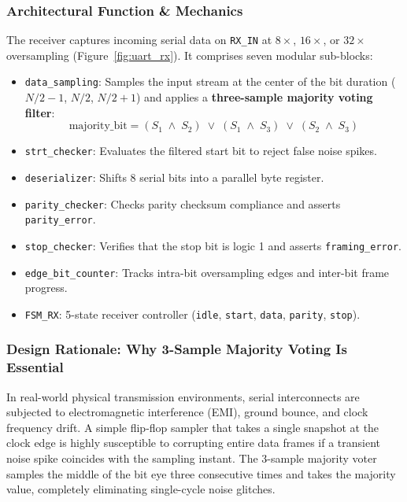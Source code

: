 \documentclass[11pt,a4paper]{article}
\begin{document}
\subsubsection{Architectural Function \& Mechanics}
The receiver captures incoming serial data on \texttt{RX\_IN} at $8\times$, $16\times$, or $32\times$ oversampling (Figure~\ref{fig:uart_rx}). It comprises seven modular sub-blocks:
\begin{itemize}
    \item \texttt{data\_sampling}: Samples the input stream at the center of the bit duration ($N/2-1$, $N/2$, $N/2+1$) and applies a \textbf{three-sample majority voting filter}:
    \begin{equation}
    \text{majority\_bit} = (S_1 \;\land\; S_2) \;\lor\; (S_1 \;\land\; S_3) \;\lor\; (S_2 \;\land\; S_3)
    \end{equation}
    \item \texttt{strt\_checker}: Evaluates the filtered start bit to reject false noise spikes.
    \item \texttt{deserializer}: Shifts 8 serial bits into a parallel byte register.
    \item \texttt{parity\_checker}: Checks parity checksum compliance and asserts \texttt{parity\_error}.
    \item \texttt{stop\_checker}: Verifies that the stop bit is logic 1 and asserts \texttt{framing\_error}.
    \item \texttt{edge\_bit\_counter}: Tracks intra-bit oversampling edges and inter-bit frame progress.
    \item \texttt{FSM\_RX}: 5-state receiver controller (\texttt{idle}, \texttt{start}, \texttt{data}, \texttt{parity}, \texttt{stop}).
\end{itemize}

\subsubsection{Design Rationale: Why 3-Sample Majority Voting Is Essential}
In real-world physical transmission environments, serial interconnects are subjected to electromagnetic interference (EMI), ground bounce, and clock frequency drift. A simple flip-flop sampler that takes a single snapshot at the clock edge is highly susceptible to corrupting entire data frames if a transient noise spike coincides with the sampling instant. The 3-sample majority voter samples the middle of the bit eye three consecutive times and takes the majority value, completely eliminating single-cycle noise glitches.
\end{document}
